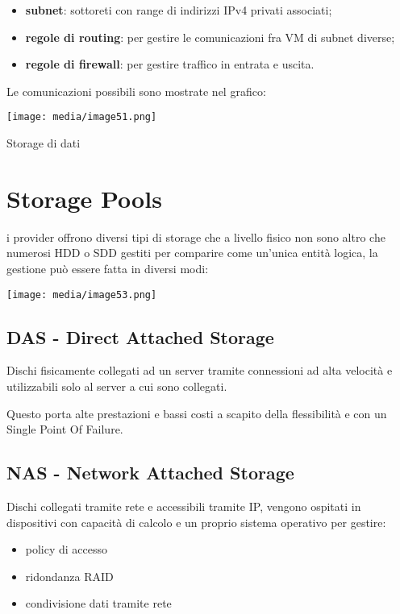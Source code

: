 \begin{itemize}
\item
  \textbf{subnet}: sottoreti con range di indirizzi IPv4 privati
  associati;
\item
  \textbf{regole di routing}: per gestire le comunicazioni fra VM di
  subnet diverse;
\item
  \textbf{regole di firewall}: per gestire traffico in entrata e uscita.
\end{itemize}

Le comunicazioni possibili sono mostrate nel grafico:

\texttt{[image: media/image51.png]}

Storage di dati

\section{Storage Pools}\label{storage-pools}

i provider offrono diversi tipi di storage che a livello fisico non sono
altro che numerosi HDD o SDD gestiti per comparire come un'unica entità
logica, la gestione può essere fatta in diversi modi:

\texttt{[image: media/image53.png]}

\subsection{DAS - Direct Attached
Storage}\label{das---direct-attached-storage}

Dischi fisicamente collegati ad un server tramite connessioni ad alta
velocità e utilizzabili solo al server a cui sono collegati.

Questo porta alte prestazioni e bassi costi a scapito della flessibilità
e con un Single Point Of Failure.

\subsection{NAS - Network Attached
Storage}\label{nas---network-attached-storage}

Dischi collegati tramite rete e accessibili tramite IP, vengono ospitati
in dispositivi con capacità di calcolo e un proprio sistema operativo
per gestire:

\begin{itemize}
\item
  policy di accesso
\item
  ridondanza RAID
\item
  condivisione dati tramite rete
\end{itemize}

